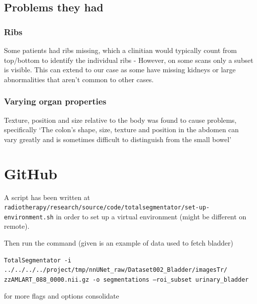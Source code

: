 \documentclass[11pt]{article}
\begin{document}
\subsection{Problems they had}

\subsubsection{Ribs}

Some patients had ribs missing, which a clinitian would typically count from top/bottom to identify the individual ribs - However, on some scans only a subset is visible. This can extend to our case as some have missing kidneys or large abnormalities that aren't common to other cases.

\subsubsection{Varying organ properties}

Texture, position and size relative to the body was found to cause problems, specifically `The colon's shape, size, texture and position in the abdomen can vary greatly and is sometimes difficult to distinguish from the small bowel'

\section{GitHub}

A script has been written at \texttt{radiotherapy/research/source/code/totalsegmentator/set-up-environment.sh} in order to set up a virtual environment (might be different on remote). 

Then run the command (given is an example of data used to fetch bladder)

\texttt{TotalSegmentator -i ../../../../project/tmp/nnUNet\_raw/Dataset002\_Bladder/imagesTr/ zzAMLART\_088\_0000.nii.gz -o segmentations --roi\_subset urinary\_bladder}

for more flags and options consolidate~\cite{totalsegmentor-git}

\printbibliography
\end{document}
